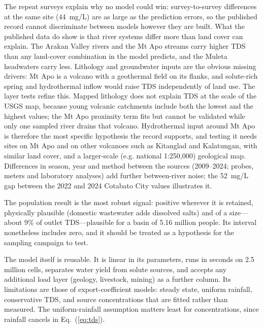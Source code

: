 \documentclass[10pt,twocolumn,letterpaper]{article}
\begin{document}
The repeat surveys explain why no model could win: survey-to-survey differences at the same site (44~mg/L) are as large as the prediction errors, so the published record cannot discriminate between models however they are built. What the published data do show is that river systems differ more than land cover can explain. The Arakan Valley rivers and the Mt Apo streams carry higher TDS than any land-cover combination in the model predicts, and the Muleta headwaters carry less. Lithology and groundwater inputs are the obvious missing drivers: Mt Apo is a volcano with a geothermal field on its flanks, and solute-rich spring and hydrothermal inflow would raise TDS independently of land use. The layer tests refine this. Mapped lithology does not explain TDS at the scale of the USGS map, because young volcanic catchments include both the lowest and the highest values; the Mt Apo proximity term fits but cannot be validated while only one sampled river drains that volcano. Hydrothermal input around Mt Apo is therefore the most specific hypothesis the record supports, and testing it needs sites on Mt Apo and on other volcanoes such as Kitanglad and Kalatungan, with similar land cover, and a larger-scale (e.g. national 1:250,000) geological map. Differences in season, year and method between the sources (2009--2024; probes, meters and laboratory analyses) add further between-river noise; the 52~mg/L gap between the 2022 and 2024 Cotabato City values illustrates it.

The population result is the most robust signal: positive wherever it is retained, physically plausible (domestic wastewater adds dissolved salts) and of a size---about 9\% of outlet TDS---plausible for a basin of 5.16 million people. Its interval nonetheless includes zero, and it should be treated as a hypothesis for the sampling campaign to test.

The model itself is reusable. It is linear in its parameters, runs in seconds on 2.5 million cells, separates water yield from solute sources, and accepts any additional load layer (geology, livestock, mining) as a further column. Its limitations are those of export-coefficient models: steady state, uniform rainfall, conservative TDS, and source concentrations that are fitted rather than measured. The uniform-rainfall assumption matters least for concentrations, since rainfall cancels in Eq.~(\ref{eq:tds}).
\end{document}
